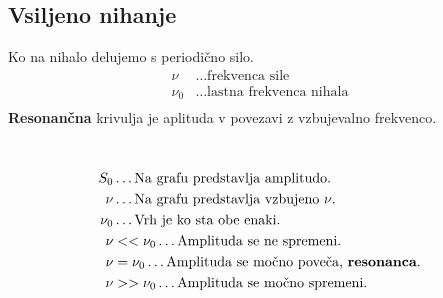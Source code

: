 {\color{indiagreen}\subsection{Vsiljeno nihanje}}
Ko na nihalo delujemo s periodično silo.\\
\begin{align*}
	\nu &\dots \text{frekvenca sile}\\
	\nu_0 &\dots \text{lastna frekvenca nihala}\\
\end{align*}
\textbf{Resonančna} krivulja je aplituda v povezavi z vzbujevalno frekvenco.
\\
\begin{align*}
	S_0 &\dots \text{Na grafu predstavlja amplitudo.}\\
	\nu &\dots \text{Na grafu predstavlja vzbujeno $\nu$.}\\
	\nu_0 &\dots \text{Vrh je ko sta obe enaki.}\\
	\nu &<<\nu_0 \dots \text{Amplituda se ne spremeni.}\\ 
	\nu &=\nu_0 \dots \text{Amplituda se močno poveča, \textbf{resonanca}.}\\
	\nu &>>\nu_0 \dots \text{Amplituda se močno spremeni.}\\
\end{align*}
